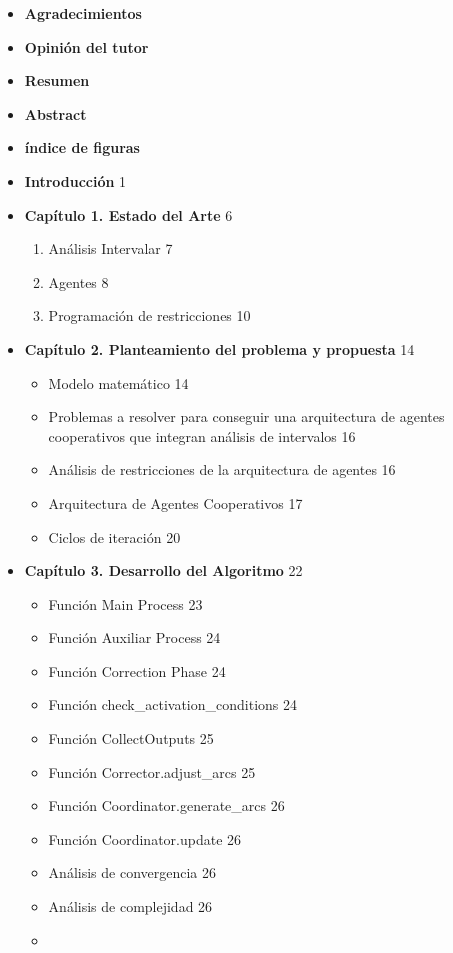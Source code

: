 \tableofcontents

\begin{itemize}
\item  \textbf{Agradecimientos} 
\item \textbf{Opinión del tutor}
\item \textbf{Resumen} 
\item \textbf{Abstract} 
\item \textbf{índice de figuras} 
\item \textbf{Introducción} \hfill 1
\item \textbf{ Capítulo 1. Estado del Arte} \hfill 6
\begin{enumerate}
    \item Análisis Intervalar \hfill 7
    \item Agentes \hfill 8
    \item Programación de restricciones \hfill 10
\end{enumerate}    

\item \textbf{ Capítulo 2. Planteamiento del problema y
propuesta} \hfill 14
\begin{itemize}
    \item Modelo matemático \hfill 14
    \item Problemas a resolver para conseguir una arquitectura de
    agentes cooperativos que integran análisis de intervalos \hfill 16
    \item Análisis de restricciones de la arquitectura de agentes \hfill 16
    \item Arquitectura de Agentes Cooperativos \hfill 17
    \item Ciclos de iteración \hfill 20
\end{itemize}

\item \textbf{ Capítulo 3. Desarrollo del Algoritmo} \hfill 22
\begin{itemize}
    \item Función Main Process \hfill 23
    \item Función Auxiliar Process \hfill 24
    \item Función Correction Phase \hfill 24
    \item Función check_activation_conditions \hfill 24
    \item Función CollectOutputs \hfill 25
    \item Función Corrector.adjust_arcs \hfill 25
    \item Función Coordinator.generate_arcs \hfill 26
    \item Función Coordinator.update \hfill 26
    \item Análisis de convergencia \hfill 26
    \item Análisis de complejidad \hfill 26
    \item 
\end{itemize}


\end{itemize}
